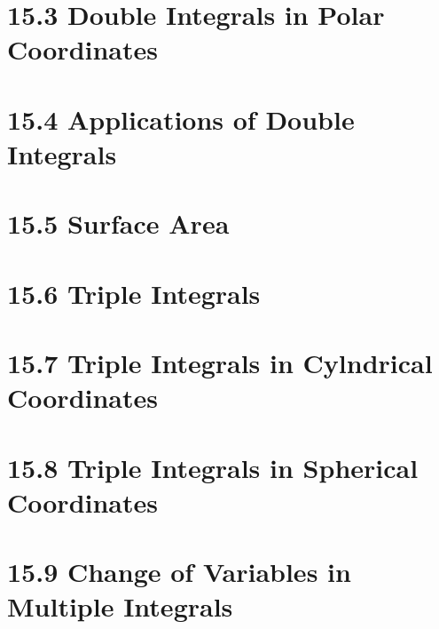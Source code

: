 \documentclass{article}
\begin{document}
\section*{15.3 Double Integrals in Polar Coordinates}
\section*{15.4 Applications of Double Integrals}
\section*{15.5 Surface Area}
\section*{15.6 Triple Integrals}
\section*{15.7 Triple Integrals in Cylndrical Coordinates}
\section*{15.8 Triple Integrals in Spherical Coordinates}
\section*{15.9 Change of Variables in Multiple Integrals}
\end{document}
